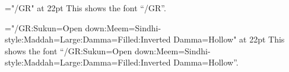 \def\testDamma#1{
  \font\x="#1" at 22pt \x
    This shows the font “#1”. \par
    \damma\dammaext\par}
\baselineskip=14pt

\def\testDammatan#1{
  \font\x="#1" at 22pt \x
    This shows the font “#1”. \par
    \dammatan\dammatanext\par}
\baselineskip=14pt

\def\testInvDamma#1{
  \font\x="#1" at 22pt \x
    This shows the font “#1”. \par
    \invdamma\invdammaext\par}
\baselineskip=14pt

\def\testSukun#1{
  \font\x="#1" at 22pt \x
    This shows the font “#1”. \par
    \sukun\sukunext\par}
\baselineskip=14pt

\def\testEndAyah#1{
  \font\x="#1" at 22pt \x
    This shows the font “#1”. \par
    \endayah\par}
\baselineskip=14pt

\def\testDigits#1{
  \font\x="#1" at 22pt \x
    This shows the font “#1”. \par
    \digits\par}
\baselineskip=14pt

\def\testComma#1{
  \font\x="#1" at 22pt \x
    This shows the font “#1”. \par
    \comma\par}
\baselineskip=14pt


\def\testSampleWords#1{
  \font\x="#1" at 22pt \x
    This shows the font “#1”. \par
    \SampleWords\par}
\baselineskip=14pt

\testSampleWords{\myABSfontname/GR}
\testSampleWords{\myABSfontname/GR:Sukun=Open down:Meem=Sindhi-style:Maddah=Large:Damma=Filled:Inverted Damma=Hollow}




\bigskip
{}

\bigskip
{}

